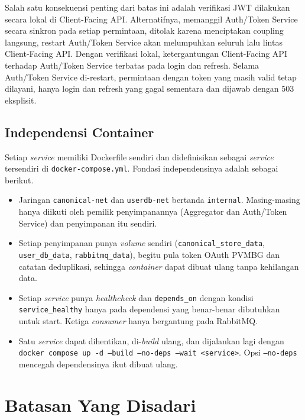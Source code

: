 Salah satu konsekuensi penting dari batas ini adalah verifikasi JWT dilakukan secara lokal di Client-Facing API. Alternatifnya, memanggil Auth/Token Service secara sinkron pada setiap permintaan, ditolak karena menciptakan coupling langsung, restart Auth/Token Service akan melumpuhkan seluruh lalu lintas Client-Facing API. Dengan verifikasi lokal, ketergantungan Client-Facing API terhadap Auth/Token Service terbatas pada login dan refresh. Selama Auth/Token Service di-restart, permintaan dengan token yang masih valid tetap dilayani, hanya login dan refresh yang gagal sementara dan dijawab dengan 503 eksplisit.

\subsection{Independensi Container}

Setiap \textit{service} memiliki Dockerfile sendiri dan didefinisikan sebagai \textit{service} tersendiri di \texttt{docker-compose.yml}. Fondasi independensinya adalah sebagai berikut.

\begin{itemize}
\tightlist
\item
  Jaringan \texttt{canonical-net} dan \texttt{userdb-net} bertanda \texttt{internal}. Masing-masing hanya diikuti oleh pemilik penyimpanannya (Aggregator dan Auth/Token Service) dan penyimpanan itu sendiri.\\
\item
  Setiap penyimpanan punya \textit{volume} sendiri (\texttt{canonical\_store\_data}, \texttt{user\_db\_data}, \texttt{rabbitmq\_data}), begitu pula token OAuth PVMBG dan catatan deduplikasi, sehingga \textit{container} dapat dibuat ulang tanpa kehilangan data.\\
\item
  Setiap \textit{service} punya \textit{healthcheck} dan \texttt{depends\_on} dengan kondisi \texttt{service\_healthy} hanya pada dependensi yang benar-benar dibutuhkan untuk start. Ketiga \textit{consumer} hanya bergantung pada RabbitMQ.\\
\item
  Satu \textit{service} dapat dihentikan, di-\textit{build} ulang, dan dijalankan lagi dengan \texttt{docker compose up -d --build --no-deps --wait <service>}. Opsi \texttt{--no-deps} mencegah dependensinya ikut dibuat ulang.
\end{itemize}

\section{Batasan Yang Disadari}

